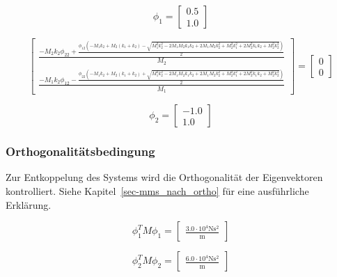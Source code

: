 \documentclass[
  letterpaper,
  DIV=11]{scrreprt}
\begin{document}
\begin{equation}\phi_{1} = \left[\begin{matrix}0.5\\1.0\end{matrix}\right]\end{equation}

\begin{equation}\left[\begin{matrix}\frac{- M_{2} k_{2} \phi_{22} + \frac{\phi_{12} \left(- M_{1} k_{2} + M_{2} \left(k_{1} + k_{2}\right) - \sqrt{M_{1}^{2} k_{2}^{2} - 2 M_{1} M_{2} k_{1} k_{2} + 2 M_{1} M_{2} k_{2}^{2} + M_{2}^{2} k_{1}^{2} + 2 M_{2}^{2} k_{1} k_{2} + M_{2}^{2} k_{2}^{2}}\right)}{2}}{M_{2}}\\\frac{- M_{1} k_{2} \phi_{12} - \frac{\phi_{22} \left(- M_{1} k_{2} + M_{2} \left(k_{1} + k_{2}\right) + \sqrt{M_{1}^{2} k_{2}^{2} - 2 M_{1} M_{2} k_{1} k_{2} + 2 M_{1} M_{2} k_{2}^{2} + M_{2}^{2} k_{1}^{2} + 2 M_{2}^{2} k_{1} k_{2} + M_{2}^{2} k_{2}^{2}}\right)}{2}}{M_{1}}\end{matrix}\right] = \left[\begin{matrix}0\\0\end{matrix}\right]\end{equation}

\begin{equation}\phi_{2} = \left[\begin{matrix}-1.0\\1.0\end{matrix}\right]\end{equation}

\hypertarget{orthogonalituxe4tsbedingung}{%
\subsubsection{Orthogonalitätsbedingung}\label{orthogonalituxe4tsbedingung}}

Zur Entkoppelung des Systems wird die Orthogonalität der Eigenvektoren
kontrolliert. Siehe Kapitel~\ref{sec-mms_nach_ortho} für eine
ausführliche Erklärung.

\begin{equation}\phi_{1}^{T} M \phi_{1} = \left[\begin{matrix}\frac{3.0 \cdot 10^{4} \text{N} \text{s}^{2}}{\text{m}}\end{matrix}\right]\end{equation}

\begin{equation}\phi_{2}^{T} M \phi_{2} = \left[\begin{matrix}\frac{6.0 \cdot 10^{4} \text{N} \text{s}^{2}}{\text{m}}\end{matrix}\right]\end{equation}
\end{document}
